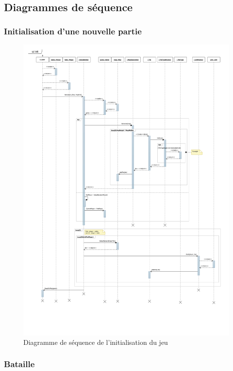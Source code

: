 \subsection{Diagrammes de séquence}
\label{diagSequence}
\subsubsection{Initialisation d'une nouvelle partie}

\begin{figure}[h]
  \centering
  \includegraphics[width=13cm]{schemas/sd_init.png}
  \caption{Diagramme de séquence de l'initialisation du jeu}
  \label{fig:sd_init}
\end{figure}

\subsubsection{Bataille}

